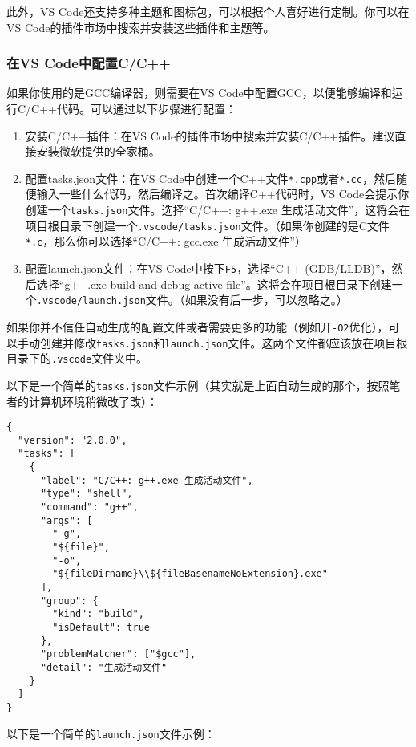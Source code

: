 \documentclass[../main.tex]{subfiles}
\begin{document}
此外，VS Code还支持多种主题和图标包，可以根据个人喜好进行定制。你可以在VS Code的插件市场中搜索并安装这些插件和主题等。

\subsubsection{在VS Code中配置C/C++}\label{sec:configure-cpp}

如果你使用的是GCC编译器，则需要在VS Code中配置GCC，以便能够编译和运行C/C++代码。可以通过以下步骤进行配置：

\begin{enumerate}
  \item 安装C/C++插件：在VS Code的插件市场中搜索并安装C/C++插件。建议直接安装微软提供的全家桶。
  \item 配置tasks.json文件：在VS Code中创建一个C++文件\texttt{*.cpp}或者\texttt{*.cc}，然后随便输入一些什么代码，然后编译之。首次编译C++代码时，VS Code会提示你创建一个\texttt{tasks.json}文件。选择“C/C++: g++.exe 生成活动文件”，这将会在项目根目录下创建一个\texttt{.vscode/tasks.json}文件。（如果你创建的是C文件\texttt{*.c}，那么你可以选择“C/C++: gcc.exe 生成活动文件”）
  \item 配置launch.json文件：在VS Code中按下\texttt{F5}，选择“C++ (GDB/LLDB)”，然后选择“g++.exe build and debug active file”。这将会在项目根目录下创建一个\texttt{.vscode/launch.json}文件。（如果没有后一步，可以忽略之。）
\end{enumerate}

如果你并不信任自动生成的配置文件或者需要更多的功能（例如开\texttt{-O2}优化），可以手动创建并修改\texttt{tasks.json}和\texttt{launch.json}文件。这两个文件都应该放在项目根目录下的\texttt{.vscode}文件夹中。

以下是一个简单的\texttt{tasks.json}文件示例（其实就是上面自动生成的那个，按照笔者的计算机环境稍微改了改）：

\begin{lstlisting}
{
  "version": "2.0.0",
  "tasks": [
    {
      "label": "C/C++: g++.exe 生成活动文件",
      "type": "shell",
      "command": "g++",
      "args": [
        "-g",
        "${file}",
        "-o",
        "${fileDirname}\\${fileBasenameNoExtension}.exe"
      ],
      "group": {
        "kind": "build",
        "isDefault": true
      },
      "problemMatcher": ["$gcc"],
      "detail": "生成活动文件"
    }
  ]
}
\end{lstlisting}

以下是一个简单的\texttt{launch.json}文件示例：
\end{document}
